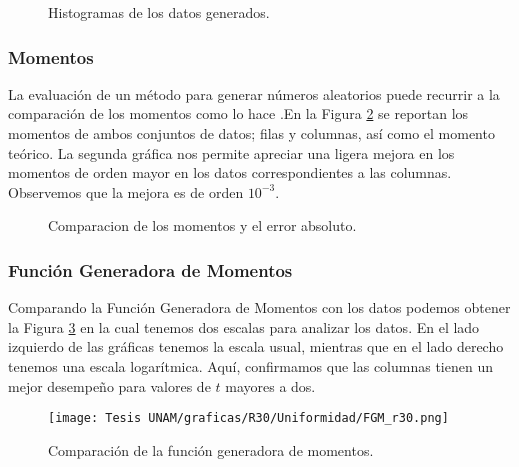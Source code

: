 \documentclass[../Main.tex]{subfiles}
\begin{document}
\begin{figure}[h!]
\hfill
{}
\hfill
{}
\hfill
\caption{Histogramas de los datos generados.}
\label{fig:hist_R30}
\end{figure}
\subsubsection{Momentos}
La evaluación de un método para generar números aleatorios puede recurrir a la comparación de los momentos como lo hace \cite{Logistic Map: A Possible Random Number
Generator}.En la Figura \ref{fig:momentos_R30} se reportan los momentos de ambos conjuntos de datos; filas y columnas, así como el momento teórico. La segunda gráfica nos permite apreciar una ligera mejora en los momentos de orden mayor en los datos correspondientes a las columnas. Observemos que la mejora es de orden $10^{-3}$.

\begin{figure}[h!]
\hfill
{}
\hfill
{}
\hfill
\caption{Comparacion de los momentos y el error absoluto.}
\label{fig:momentos_R30}
\end{figure}

\subsubsection{Función Generadora de Momentos}
Comparando la Función Generadora de Momentos con los datos podemos obtener la Figura \ref{fig:FGM_R30} en la cual  tenemos dos escalas para analizar los datos. En el lado izquierdo de las gráficas tenemos la escala usual, mientras que en el lado derecho tenemos una escala logarítmica. Aquí, confirmamos que las columnas tienen un mejor desempeño para valores de $t$ mayores a dos.

\begin{figure}[h!]
\hfill
\subfigure
{\texttt{[image: Tesis UNAM/graficas/R30/Uniformidad/FGM\_r30.png]}}
\hfill
{}
\hfill
\caption{Comparación de la función generadora de momentos.}
\label{fig:FGM_R30}
\end{figure}
\end{document}
